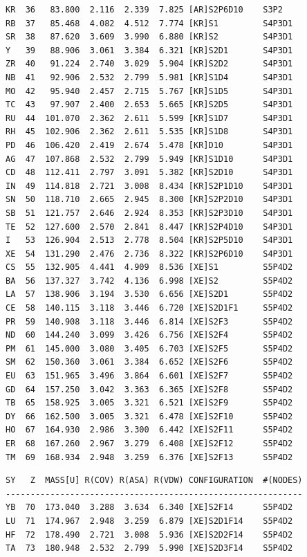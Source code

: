 \documentclass[final,12pt,makeidx,DIV=calc]{article}
\begin{document}
{{{\begin{verbatim}
KR  36   83.800  2.116  2.339  7.825 [AR]S2P6D10    S3P2      
RB  37   85.468  4.082  4.512  7.774 [KR]S1         S4P3D1    
SR  38   87.620  3.609  3.990  6.880 [KR]S2         S4P3D1    
Y   39   88.906  3.061  3.384  6.321 [KR]S2D1       S4P3D1    
ZR  40   91.224  2.740  3.029  5.904 [KR]S2D2       S4P3D1    
NB  41   92.906  2.532  2.799  5.981 [KR]S1D4       S4P3D1    
MO  42   95.940  2.457  2.715  5.767 [KR]S1D5       S4P3D1    
TC  43   97.907  2.400  2.653  5.665 [KR]S2D5       S4P3D1    
RU  44  101.070  2.362  2.611  5.599 [KR]S1D7       S4P3D1    
RH  45  102.906  2.362  2.611  5.535 [KR]S1D8       S4P3D1    
PD  46  106.420  2.419  2.674  5.478 [KR]D10        S4P3D1    
AG  47  107.868  2.532  2.799  5.949 [KR]S1D10      S4P3D1    
CD  48  112.411  2.797  3.091  5.382 [KR]S2D10      S4P3D1    
IN  49  114.818  2.721  3.008  8.434 [KR]S2P1D10    S4P3D1    
SN  50  118.710  2.665  2.945  8.300 [KR]S2P2D10    S4P3D1    
SB  51  121.757  2.646  2.924  8.353 [KR]S2P3D10    S4P3D1    
TE  52  127.600  2.570  2.841  8.447 [KR]S2P4D10    S4P3D1    
I   53  126.904  2.513  2.778  8.504 [KR]S2P5D10    S4P3D1    
XE  54  131.290  2.476  2.736  8.322 [KR]S2P6D10    S4P3D1    
CS  55  132.905  4.441  4.909  8.536 [XE]S1         S5P4D2    
BA  56  137.327  3.742  4.136  6.998 [XE]S2         S5P4D2    
LA  57  138.906  3.194  3.530  6.656 [XE]S2D1       S5P4D2    
CE  58  140.115  3.118  3.446  6.720 [XE]S2D1F1     S5P4D2    
PR  59  140.908  3.118  3.446  6.814 [XE]S2F3       S5P4D2    
ND  60  144.240  3.099  3.426  6.756 [XE]S2F4       S5P4D2    
PM  61  145.000  3.080  3.405  6.703 [XE]S2F5       S5P4D2    
SM  62  150.360  3.061  3.384  6.652 [XE]S2F6       S5P4D2    
EU  63  151.965  3.496  3.864  6.601 [XE]S2F7       S5P4D2    
GD  64  157.250  3.042  3.363  6.365 [XE]S2F8       S5P4D2    
TB  65  158.925  3.005  3.321  6.521 [XE]S2F9       S5P4D2    
DY  66  162.500  3.005  3.321  6.478 [XE]S2F10      S5P4D2    
HO  67  164.930  2.986  3.300  6.442 [XE]S2F11      S5P4D2    
ER  68  167.260  2.967  3.279  6.408 [XE]S2F12      S5P4D2    
TM  69  168.934  2.948  3.259  6.376 [XE]S2F13      S5P4D2    
\end{verbatim}
\newpage
\begin{verbatim}
SY   Z  MASS[U] R(COV) R(ASA) R(VDW) CONFIGURATION  #(NODES)
------------------------------------------------------------
YB  70  173.040  3.288  3.634  6.340 [XE]S2F14      S5P4D2    
LU  71  174.967  2.948  3.259  6.879 [XE]S2D1F14    S5P4D2    
HF  72  178.490  2.721  3.008  5.936 [XE]S2D2F14    S5P4D2    
TA  73  180.948  2.532  2.799  5.990 [XE]S2D3F14    S5P4D2    

\end{verbatim}}}}
\end{document}
